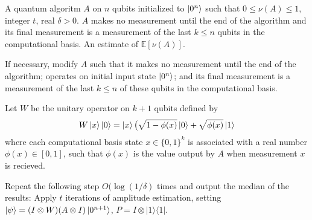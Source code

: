 \documentclass{article}
\begin{document}
\pagestyle{empty} 

\begin{algorithm}[ht]
	\caption{} 
	\begin{algorithmic}[1]

		\Require  A quantum algoritm $A$ on $n$ qubits initialized to $\ket{0^n}$ such that $0\leq \nu(A) \leq 1$, integer $t$, real $\delta>0$. $A$ makes no measurement until the end of the algorithm and its final measurement is a measurement of the last $k\leq n$ qubits in the computational basis.
		\Ensure An estimate of $\mathbb{E}[\nu(A)]$.
		\vspace{10pt}
		\Statex 

		\State If necessary, modify $A$ such that it makes no measurement until the end of the algorithm; operates on initial input state $\ket{0^n}$; and its final measurement is a measurement of the last $k\leq n$ of these qubits in the computational basis.

		\State Let $W$ be the unitary operator on $k+1$ qubits defined by 
		       \begin{equation}
		       W\ket{x}\ket{0} =\ket{x}\big(\sqrt{1-\phi(x)}\ket{0}+\sqrt{\phi(x)}\ket{1}
		       \end{equation}
		       where each computational basis state $x \in \{0,1\}^k$ is associated with a real number $\phi(x) \in [0,1]$, such that $\phi(x)$ is the value output by $A$ when measurement $x$ is recieved.

		 \State Repeat the following step $O(\log(1/\delta)$ times and output the median of the results:
		 Apply $t$ iterations of amplitude estimation, setting $\ket{\psi} = (I \otimes W)(A \otimes I)\ket{0^{n+1}}$, $P = I \otimes |1\rangle\langle 1|$.


	\end{algorithmic}
\end{algorithm}
\end{document}
